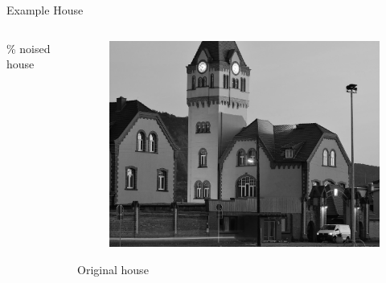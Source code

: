 \documentclass[mathserif]{beamer}
\begin{document}
\begin{frame}{Example House}
\begin{columns}
\begin{column}{.3\textwidth}
\begin{figure}
            \end{figure}
                \% noised house \phantom{cycles using $\hat D_p(f_p)$} 
        \end{column}
        \begin{column}{.3\textwidth}
            \begin{figure}
                \centering
                \includegraphics[width=\textwidth]{../testimages/houses/houses_500_20/house_500.png}
            \end{figure}
                \centering
            Original house \phantom{cycles using $\hat D_p(f_p)$} 
        \end{column}
    \end{columns}
\end{frame}
\end{document}
